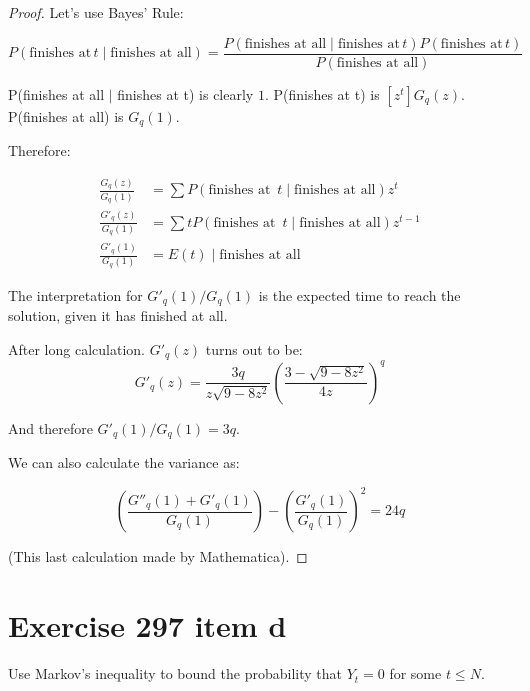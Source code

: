 \documentclass[10pt]{book}
\begin{document}
\begin{proof}
Let's use Bayes' Rule:

$$P(\text{finishes at} \,t \mid \text{finishes at all}) =
\frac{P(\text{finishes at all} \mid \text{finishes at} \,t)
P(\text{finishes at} \,t)}{P(\text{finishes at all})}$$

      P(finishes at all $\mid$ finishes at t) is clearly $1$. P(finishes at t) is $[z^t]G_q(z)$. P(finishes at all) is $G_q(1)$.

      Therefore:

\begin{align*}
  \frac{G_q(z)}{G_q(1)} &= 
  \sum P(\text{finishes at }\,t\mid\text{finishes at all}) z^t\\
  \frac{G'_q(z)}{G_q(1)} &= 
  \sum t P(\text{finishes at }\,t\mid\text{finishes at all}) z^{t-1}\\
  \frac{G'_q(1)}{G_q(1)} &= 
  E(t) \mid\text{finishes at all}
\end{align*}

The interpretation for $G'_q(1)/G_q(1)$ is the expected time to reach the solution, given it has finished at all.

After long calculation. $G'_q(z)$ turns out to be:
$$G'_q(z)=\frac{3q}{z\sqrt{9-8z^2}}\left(\frac{3-\sqrt{9-8z^2}}{4z}\right)^q$$

And therefore $G'_q(1)/G_q(1)=3q$.

We can also calculate the variance as:

$$\left(\frac{G''_q(1)+G'_q(1)}{G_q(1)}\right)-\left(\frac{G'_q(1)}{G_q(1)}\right)^2=24q$$

(This last calculation made by Mathematica).

\end{proof}

\section{Exercise 297 item d}

Use Markov's inequality to bound the probability that $Y_t=0$ for some $t\le N$.
\end{document}
